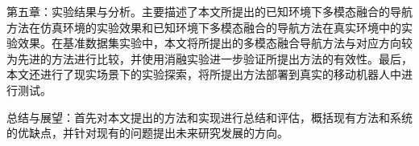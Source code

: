 	第五章：实验结果与分析。主要描述了本文所提出的已知环境下多模态融合的导航方法在仿真环境的实验效果和已知环境下多模态融合的导航方法在真实环境中的实验效果。在基准数据集实验中，本文将所提出的多模态融合导航方法与对应方向较为先进的方法进行比较，并使用消融实验进一步验证所提出方法的有效性。最后，本文还进行了现实场景下的实验探索，将所提出方法部署到真实的移动机器人中进行测试。

	总结与展望：首先对本文提出的方法和实现进行总结和评估，概括现有方法和系统的优缺点，并针对现有的问题提出未来研究发展的方向。





